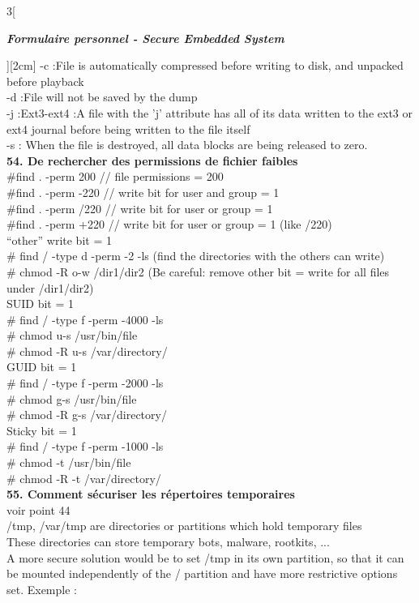 \begin{multicols}{3}[\centerline{ \large\em \textbf{Formulaire personnel - Secure Embedded System}}][2cm]
-c :File is automatically compressed before writing to disk, and unpacked
before playback\\
-d :File will not be saved by the dump\\
-j :Ext3-ext4 :A file with the 'j' attribute has all of its data written to
the ext3 or ext4 journal before being written to the file itself\\
-s : When the file is destroyed, all data blocks are being released to zero.
\\ \textbf{54. De rechercher des permissions de fichier faibles\\}
\#find . -perm 200 // file permissions = 200\\
\#find . -perm -220 // write bit for user and group = 1\\
\#find . -perm /220 // write bit for user or group = 1\\
\#find . -perm +220 // write bit for user or group = 1 (like /220)\\
“other” write bit = 1\\
\# find / -type d -perm -2 -ls (find the directories with the others can write)\\
\# chmod -R o-w /dir1/dir2 (Be careful: remove other bit = write for all files under /dir1/dir2)\\
SUID bit = 1\\
\# find / -type f -perm -4000 -ls\\
\# chmod u-s /usr/bin/file\\
\# chmod -R u-s /var/directory/ \\
GUID bit = 1\\
\# find / -type f -perm -2000 -ls\\
\# chmod g-s /usr/bin/file\\
\# chmod -R g-s /var/directory/ \\
Sticky bit = 1\\
\# find / -type f -perm -1000 -ls\\
\# chmod -t /usr/bin/file\\
\# chmod -R -t /var/directory/ 
\\ \textbf{55. Comment sécuriser les répertoires temporaires\\}
voir point 44\\
/tmp, /var/tmp are directories or partitions which hold temporary files\\
These directories can store temporary bots, malware, rootkits, ...\\
A more secure solution would be to set /tmp in its own partition, so that it can be mounted independently of the / partition and have more restrictive options set. Exemple :\\

\end{multicols}
